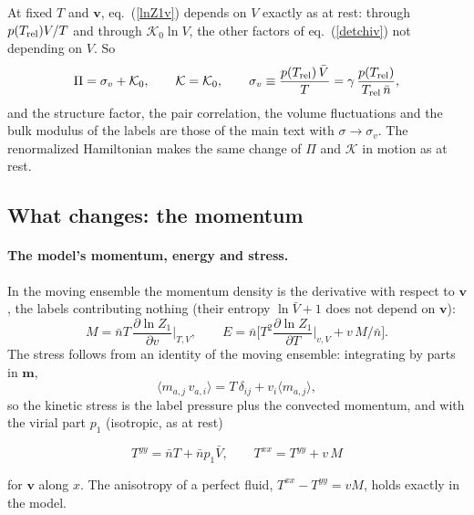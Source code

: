\documentclass[11pt,aps,preprint,nofootinbib,superscriptaddress,tightenlines]{revtex4-2}
\newcommand{\avg}[1]{\langle #1\rangle}
\def\st{\begin{equation}}
\def\stp{\end{equation}}
\def\Eq#1{eq.~(\ref{#1})}
\let\oldparagraph\paragraph
\renewcommand{\paragraph}{\par\bigskip\oldparagraph}
\begin{document}
At fixed $T$ and $\bm v$, \Eq{lnZ1v} depends on $V$ exactly as at rest: through $p(T_{\rm rel})V/T$ and through $\mathcal K_0\ln V$, the other factors of \Eq{detchiv} not
depending on $V$.  So
\st
\Pi=\sigma_v+\mathcal K_0,\qquad \mathcal K=\mathcal K_0,\qquad \sigma_v\equiv\frac{p(T_{\rm rel})\,\bar V}{T}=\gamma\,\frac{p(T_{\rm rel})}{T_{\rm rel}\,\bar n} ,
\stp
and the structure factor, the pair correlation, the volume fluctuations and the bulk modulus of the labels are those of the main text with $\sigma\to\sigma_v$.  The
renormalized Hamiltonian makes the same change of $\Pi$ and $\mathcal K$ in motion as at rest.

\subsection{What changes: the momentum}
\label{sec:motion_momentum}

\paragraph{The model's momentum, energy and stress.}  In the moving ensemble the momentum density is the derivative with respect to $\bm v$, the labels contributing
nothing (their entropy $\ln\bar V+1$ does not depend on $\bm v$):
\st
M=\bar nT\,\frac{\partial\ln Z_1}{\partial v}\Big|_{T,V},\qquad
E=\bar n\Big[T^2\frac{\partial\ln Z_1}{\partial T}\Big|_{v,V}+v\,M/\bar n\Big] .
\stp
The stress follows from an identity of the moving ensemble: integrating by parts in $\bm m$,
\st
\avg{m_{a,j}\,v_{a,i}}=T\,\delta_{ij}+v_i\avg{m_{a,j}} ,
\stp
so the kinetic stress is the label pressure plus the convected momentum, and with the virial part $p_1$ (isotropic, as at rest)
\begin{keyeq}
\st
T^{yy}=\bar nT+\bar np_1\bar V,\qquad T^{xx}=T^{yy}+v\,M
\label{anisotropy}
\stp
\end{keyeq}
for $\bm v$ along $x$.  The anisotropy of a perfect fluid, $T^{xx}-T^{yy}=vM$, holds exactly in the model.
\end{document}
